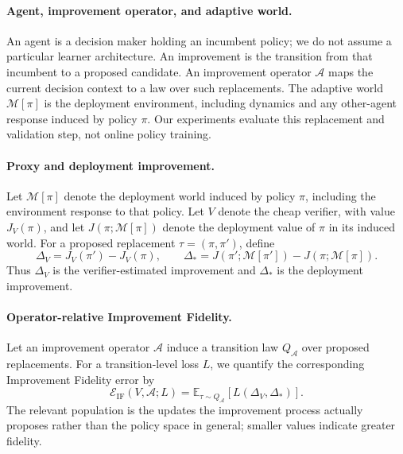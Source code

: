 \documentclass{article}
\newcommand{\E}{\mathbb{E}}
\newcommand{\M}{\mathcal{M}}
\newcommand{\pii}{\pi}
\newcommand{\pip}{\pi'}
\begin{document}
\paragraph{Agent, improvement operator, and adaptive world.}
An agent is a decision maker holding an incumbent policy; we do not assume a
particular learner architecture. An improvement is the transition from that
incumbent to a proposed candidate. An improvement operator $\mathcal A$ maps
the current decision context to a law over such replacements. The adaptive
world $\M[\pi]$ is the deployment environment, including dynamics and any
other-agent response induced by policy $\pi$. Our experiments evaluate this
replacement and validation step, not online policy training.

\paragraph{Proxy and deployment improvement.}
Let $\M[\pi]$ denote the deployment world induced by policy $\pi$, including
the environment response to that policy. Let $V$ denote the cheap verifier,
with value $J_V(\pi)$, and let $J(\pi;\M[\pi])$ denote the deployment value
of $\pi$ in its induced world. For a
proposed replacement $\tau=(\pii,\pip)$, define
\begin{equation}
  \Delta_V=J_V(\pip)-J_V(\pii),
  \qquad
  \Delta_*=J(\pip;\M[\pip])-J(\pii;\M[\pii]).
  \label{eq:improvement}
\end{equation}
Thus $\Delta_V$ is the verifier-estimated improvement and $\Delta_*$ is the
deployment improvement.

\paragraph{Operator-relative Improvement Fidelity.}
Let an improvement operator $\mathcal A$ induce a transition law
$Q_{\mathcal A}$ over proposed replacements. For a transition-level loss $L$,
we quantify the corresponding Improvement Fidelity error by
\begin{equation}
  \mathcal E_{\mathrm{IF}}(V,\mathcal A;L)
  =
  \E_{\tau\sim Q_{\mathcal A}}
  [L(\Delta_V,\Delta_*)].
  \label{eq:if}
\end{equation}
The relevant population is the updates the improvement process actually
proposes rather than the policy space in general; smaller values indicate
greater fidelity.
\end{document}

